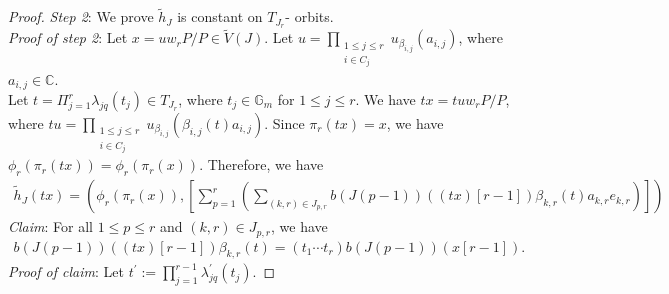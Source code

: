 \documentclass[12pt,reqno]{amsart}
\numberwithin{equation}{section}
\theoremstyle{definition}
\begin{document}
\begin{proof}
		{\it Step 2}: We prove $\tilde{h}_{J}$ is constant on $T_{J_{r}}$- orbits.\\
		{\it Proof of step 2}: Let $x=uw_{r}P/P\in \tilde{V}(J)$. Let $u=\prod_{\substack{1\leq j\leq r\\i\in C_{j}}}u_{\beta_{i,j}}(a_{i,j})$, where $a_{i,j}\in\mathbb{C}$.\\
		Let $t=\Pi_{j=1}^{r}\lambda_{jq}(t_{j})\in T_{J_{r}}$, where $t_{j}\in\mathbb{G}_{m}$ for $1\leq j\leq r$. We have $tx=tuw_{r}P/P$, where  $tu=\prod_{\substack{1\leq j\leq r\\i\in C_{j}}}u_{\beta_{i,j}}(\beta_{i,j}(t)a_{i,j})$. Since $\pi_{r}(tx)=x$, we have $\phi_{r}(\pi_{r}(tx))=\phi_{r}(\pi_{r}(x))$. Therefore, we have 
		\begin{align}\label{eq 5.1.33}
			\tilde{h}_{J}(tx)=(\phi_{r}(\pi_{r}(x)),[\sum_{p=1}^{r}(\sum_{(k,r)\in J_{p,r}}b(J(p-1))((tx)[r-1])\beta_{k,r}(t)a_{k,r}e_{k,r})])
		\end{align}
		{\it Claim}: For all $1\leq p\leq r$ and $(k,r)\in J_{p,r}$, we have 
		\begin{align*}
			b(J(p-1))((tx)[r-1])\beta_{k,r}(t)=(t_{1}\cdots t_{r})b(J(p-1))(x[r-1]).
		\end{align*}		
		{\it Proof of claim}: Let $t^{\prime}:=\prod_{j=1}^{r-1}\lambda^{\prime}_{jq}(t_{j})$.


\end{proof}
\end{document}

